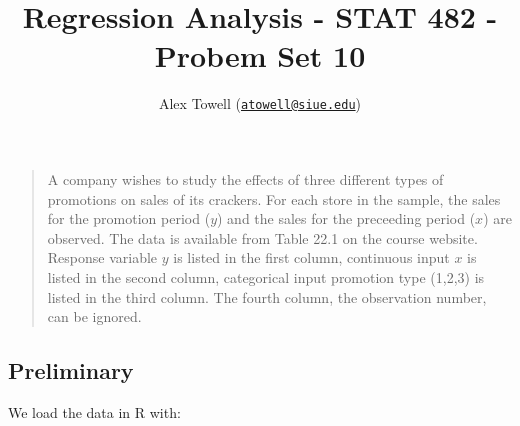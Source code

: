 \documentclass[
]{article}
\title{Regression Analysis - STAT 482 - Probem Set 10}
\author{Alex Towell
(\href{mailto:atowell@siue.edu}{\nolinkurl{atowell@siue.edu}})}
\date{}
\newenvironment{Shaded}{\begin{snugshade}}{\end{snugshade}}
\newcommand{\DecValTok}[1]{\textcolor[rgb]{0.00,0.00,0.81}{#1}}
\newcommand{\FunctionTok}[1]{\textcolor[rgb]{0.13,0.29,0.53}{\textbf{#1}}}
\newcommand{\NormalTok}[1]{#1}
\newcommand{\OtherTok}[1]{\textcolor[rgb]{0.56,0.35,0.01}{#1}}
\newcommand{\SpecialCharTok}[1]{\textcolor[rgb]{0.81,0.36,0.00}{\textbf{#1}}}
\newcommand{\StringTok}[1]{\textcolor[rgb]{0.31,0.60,0.02}{#1}}
\begin{document}
\maketitle

\newcommand{\sos}[1]{\mathrm{SS_{#1}}}
\newcommand{\ms}[1]{\mathrm{MS_{#1}}}
\newcommand{\sd}{\operatorname{sd}}
\newcommand{\var}{\operatorname{var}}
\newcommand{\expect}{\operatorname{E}}
\newcommand{\corr}{\operatorname{cor}}
\newcommand{\cov}{\operatorname{cov}}
\newcommand{\se}{\operatorname{se}}
\newcommand{\eval}[2]{\left. #1 \right\vert_{#2}}
\newcommand{\degf}[1]{\mathrm{df_{#1}}}
\newcommand{\entropy}{\operatorname{H}}
\newcommand{\param}[1]{\textcolor{blue}{\texttt{#1}}}
\newcommand{\ci}{\operatorname{CI}}

\begin{quote}
A company wishes to study the effects of three different types of
promotions on sales of its crackers. For each store in the sample, the
sales for the promotion period (\(y\)) and the sales for the preceeding
period (\(x\)) are observed. The data is available from Table 22.1 on
the course website. Response variable \(y\) is listed in the first
column, continuous input \(x\) is listed in the second column,
categorical input promotion type (1,2,3) is listed in the third column.
The fourth column, the observation number, can be ignored.
\end{quote}

\hypertarget{preliminary}{%
\subsection{Preliminary}\label{preliminary}}

We load the data in R with:

\begin{Shaded}
\end{Shaded}
\end{document}
